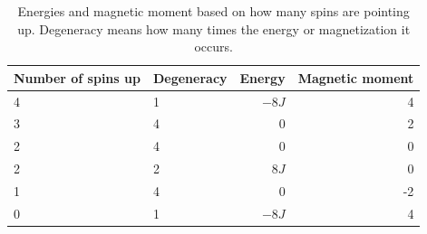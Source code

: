 \documentclass[12pt]{article}
\begin{document}
\begin{table}
\begin{center}
	\begin{tabular}{|l| l| r| r |}
	Number of spins up& Degeneracy & Energy & Magnetic moment\\
	\hline
	4 & 1 & $-8J$ & 4\\
	3 & 4 & 0 & 2\\
	2 & 4 & 0 & 0\\
	2 & 2 & $8J$ & 0\\
	1 & 4 & 0 & -2\\
	0 & 1 & $-8J$ & 4 \\
	\hline
	\end{tabular}
\caption{Energies and magnetic moment based on how many spins are pointing up. Degeneracy means how many times the energy or magnetization it occurs.}
\label{table:All_energies}
\end{center}
\end{table}
\end{document}
